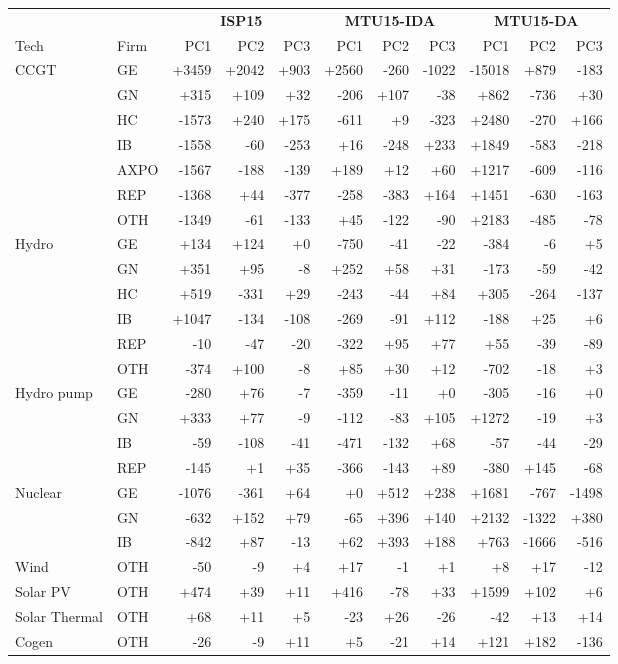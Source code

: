 \begin{tabular}{@{}l l r r r r r r r r r @{}}
\toprule
 & & \multicolumn{3}{c}{\textbf{ISP15}} & \multicolumn{3}{c}{\textbf{MTU15-IDA}} & \multicolumn{3}{c}{\textbf{MTU15-DA}} \\
\cmidrule(lr){3-5}\cmidrule(lr){6-8}\cmidrule(lr){9-11}
Tech & Firm & PC1 & PC2 & PC3 & PC1 & PC2 & PC3 & PC1 & PC2 & PC3 \\
\midrule
CCGT & GE & +3459 & +2042 & +903 & +2560 & -260 & -1022 & -15018 & +879 & -183 \\
 & GN & +315 & +109 & +32 & -206 & +107 & -38 & +862 & -736 & +30 \\
 & HC & -1573 & +240 & +175 & -611 & +9 & -323 & +2480 & -270 & +166 \\
 & IB & -1558 & -60 & -253 & +16 & -248 & +233 & +1849 & -583 & -218 \\
 & AXPO & -1567 & -188 & -139 & +189 & +12 & +60 & +1217 & -609 & -116 \\
 & REP & -1368 & +44 & -377 & -258 & -383 & +164 & +1451 & -630 & -163 \\
 & OTH & -1349 & -61 & -133 & +45 & -122 & -90 & +2183 & -485 & -78 \\
\addlinespace
Hydro & GE & +134 & +124 & +0 & -750 & -41 & -22 & -384 & -6 & +5 \\
 & GN & +351 & +95 & -8 & +252 & +58 & +31 & -173 & -59 & -42 \\
 & HC & +519 & -331 & +29 & -243 & -44 & +84 & +305 & -264 & -137 \\
 & IB & +1047 & -134 & -108 & -269 & -91 & +112 & -188 & +25 & +6 \\
 & REP & -10 & -47 & -20 & -322 & +95 & +77 & +55 & -39 & -89 \\
 & OTH & -374 & +100 & -8 & +85 & +30 & +12 & -702 & -18 & +3 \\
\addlinespace
Hydro pump & GE & -280 & +76 & -7 & -359 & -11 & +0 & -305 & -16 & +0 \\
 & GN & +333 & +77 & -9 & -112 & -83 & +105 & +1272 & -19 & +3 \\
 & IB & -59 & -108 & -41 & -471 & -132 & +68 & -57 & -44 & -29 \\
 & REP & -145 & +1 & +35 & -366 & -143 & +89 & -380 & +145 & -68 \\
\addlinespace
Nuclear & GE & -1076 & -361 & +64 & +0 & +512 & +238 & +1681 & -767 & -1498 \\
 & GN & -632 & +152 & +79 & -65 & +396 & +140 & +2132 & -1322 & +380 \\
 & IB & -842 & +87 & -13 & +62 & +393 & +188 & +763 & -1666 & -516 \\
\addlinespace
Wind & OTH & -50 & -9 & +4 & +17 & -1 & +1 & +8 & +17 & -12 \\
\addlinespace
Solar PV & OTH & +474 & +39 & +11 & +416 & -78 & +33 & +1599 & +102 & +6 \\
\addlinespace
Solar Thermal & OTH & +68 & +11 & +5 & -23 & +26 & -26 & -42 & +13 & +14 \\
\addlinespace
Cogen & OTH & -26 & -9 & +11 & +5 & -21 & +14 & +121 & +182 & -136 \\
\bottomrule
\end{tabular}
